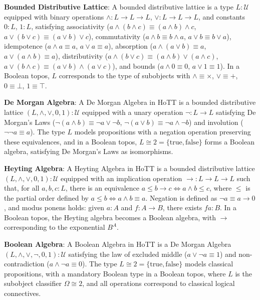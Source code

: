 \documentclass{article}
\begin{document}
\textbf{Bounded Distributive Lattice}: A bounded distributive lattice is a type $L : \mathcal{U}$ equipped with binary operations $\wedge : L \to L \to L$, $\vee : L \to L \to L$, and constants $0 : L$, $1 : L$, satisfying associativity ($a \wedge (b \wedge c) \equiv (a \wedge b) \wedge c$, $a \vee (b \vee c) \equiv (a \vee b) \vee c$), commutativity ($a \wedge b \equiv b \wedge a$, $a \vee b \equiv b \vee a$), idempotence ($a \wedge a \equiv a$, $a \vee a \equiv a$), absorption ($a \wedge (a \vee b) \equiv a$, $a \vee (a \wedge b) \equiv a$), distributivity ($a \wedge (b \vee c) \equiv (a \wedge b) \vee (a \wedge c)$, $a \vee (b \wedge c) \equiv (a \vee b) \wedge (a \vee c)$), and bounds ($a \wedge 0 \equiv 0$, $a \vee 1 \equiv 1$). In a Boolean topos, $L$ corresponds to the type of subobjects with $\wedge \equiv \times$, $\vee \equiv +$, $0 \equiv \bot$, $1 \equiv \top$.

\textbf{De Morgan Algebra}: A De Morgan Algebra in HoTT is a bounded distributive lattice $(L, \wedge, \vee, 0, 1) : \mathcal{U}$ equipped with a unary operation $\neg : L \to L$ satisfying De Morgan’s Laws ($\neg (a \wedge b) \equiv \neg a \vee \neg b$, $\neg (a \vee b) \equiv \neg a \wedge \neg b$) and involution ($\neg \neg a \equiv a$). The type $L$ models propositions with a negation operation preserving these equivalences, and in a Boolean topos, $L \cong 2 = \{\text{true}, \text{false}\}$ forms a Boolean algebra, satisfying De Morgan’s Laws as isomorphisms.

\textbf{Heyting Algebra}: A Heyting Algebra in HoTT is a bounded distributive lattice $(L, \wedge, \vee, 0, 1) : \mathcal{U}$ equipped with an implication operation $\to : L \to L \to L$ such that, for all $a, b, c : L$, there is an equivalence $a \leq b \to c \iff a \wedge b \leq c$, where $\leq$ is the partial order defined by $a \leq b \iff a \wedge b \equiv a$. Negation is defined as $\neg a \equiv a \to 0$, and modus ponens holds: given $a : A$ and $f : A \to B$, there exists $f a : B$. In a Boolean topos, the Heyting algebra becomes a Boolean algebra, with $\to$ corresponding to the exponential $B^A$.

\textbf{Boolean Algebra}: A Boolean Algebra in HoTT is a De Morgan Algebra $(L, \wedge, \vee, \neg, 0, 1) : \mathcal{U}$ satisfying the law of excluded middle ($a \vee \neg a \equiv 1$) and non-contradiction ($a \wedge \neg a \equiv 0$). The type $L \cong 2 = \{\text{true}, \text{false}\}$ models classical propositions, with a mandatory Boolean type in a Boolean topos, where $L$ is the subobject classifier $\Omega \cong 2$, and all operations correspond to classical logical connectives.
\end{document}
